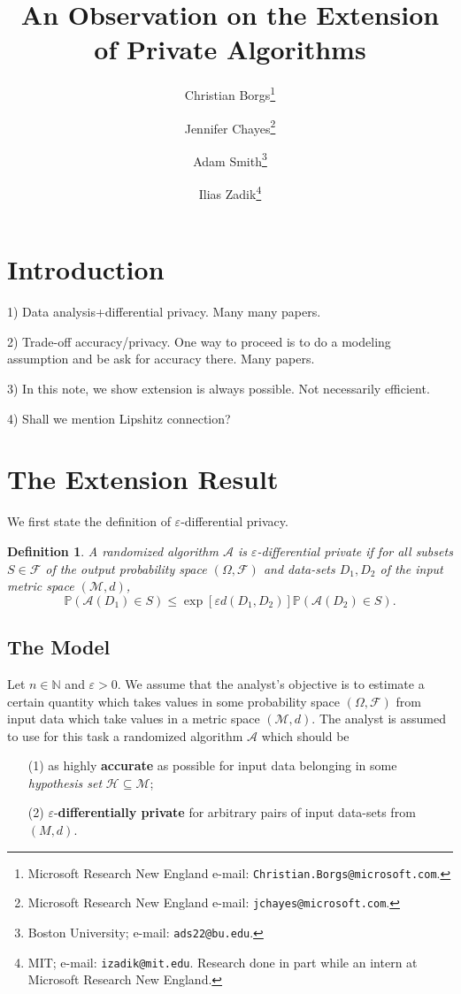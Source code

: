\documentclass[12pt,a4paper]{article}
\author{
{\sf Christian Borgs}\thanks{Microsoft Research New England e-mail: {\tt Christian.Borgs@microsoft.com}. }
\and
{\sf Jennifer Chayes}\thanks{Microsoft Research New England e-mail: {\tt jchayes@microsoft.com}.}
\and
{\sf Adam Smith}\thanks{Boston University; e-mail: {\tt ads22@bu.edu}. }
\and
{\sf Ilias Zadik}\thanks{MIT; e-mail: {\tt izadik@mit.edu}. Research done in part while an intern at Microsoft Research New England. }
}
\newtheorem{definition}[theorem]{Definition}
\numberwithin{equation}{section}
\numberwithin{equation}{section}
\renewcommand{\epsilon}{\varepsilon}
\newcommand{\1}{{\text{\Large $\mathfrak 1$}}}
\newcommand{\2}[1]{{\text{\Large $\mathfrak 1$}\!\left(#1\right)}}
\begin{document}
\title{An Observation on the Extension\\ of Private Algorithms}
\date{}




\maketitle

\begin{abstract}

\end{abstract}

\section{Introduction}

1) Data analysis+differential privacy. Many many papers.


2) Trade-off accuracy/privacy. One way to proceed is to do a modeling assumption and be ask for accuracy there. Many papers.

3) In this note, we show extension is always possible. Not necessarily efficient.

4) Shall we mention Lipshitz connection?


\section{The Extension Result}

We first state the definition of $\epsilon$-differential privacy.\begin{definition}\label{dfn}
A randomized algorithm $\mathcal{A}$ is $\epsilon$-differential private if for all subsets $S \in \mathcal{F}$ of the output probability space $(\Omega, \mathcal{F})$ and data-sets $D_1,D_2$ of the input metric space $(\mathcal{M},d)$,  $$\mathbb{P}\left(\mathcal{A}(D_1) \in S\right) \leq \exp\left[\epsilon d(D_1,D_2)\right]\mathbb{P}\left(\mathcal{A}(D_2) \in S\right).$$
\end{definition}

\subsection*{The Model}
Let $n \in \mathbb{N}$ and $\epsilon>0$. We assume that the analyst's objective is to estimate a certain quantity which takes values in some probability space $(\Omega,\mathcal{F})$ from input data which take values in a metric space $(\mathcal{M},d)$. The analyst is assumed to use for this task a randomized algorithm $\mathcal{A}$ which should be \begin{itemize}
\item[(1)] as highly \textbf{accurate} as possible for input data belonging in some \textit{hypothesis set} $\mathcal{H} \subseteq \mathcal{M}$;

\item[(2)] $\epsilon$-\textbf{differentially private} for arbitrary pairs of input data-sets from $(M,d)$.
\end{itemize}
\end{document}
